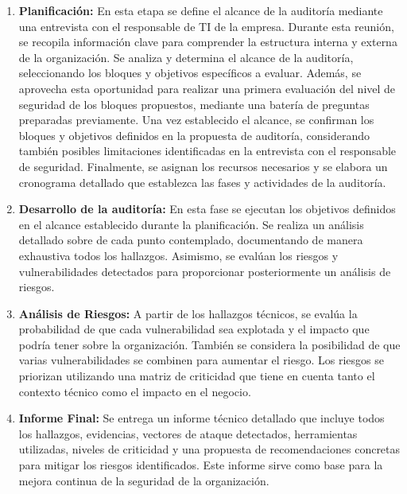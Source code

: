 \documentclass[a4paper, 10pt]{article}
\begin{document}
\begin{enumerate}
    \item \textbf{Planificación:} En esta etapa se define el alcance de la auditoría mediante una entrevista con el responsable de TI de la empresa. Durante esta reunión, se recopila información clave para comprender la estructura interna y externa de la organización. Se analiza y determina el alcance de la auditoría, seleccionando los bloques y objetivos específicos a evaluar. Además, se aprovecha esta oportunidad para realizar una primera evaluación del nivel de seguridad de los bloques propuestos, mediante una batería de preguntas preparadas previamente. Una vez establecido el alcance, se confirman los bloques y objetivos definidos en la propuesta de auditoría, considerando también posibles limitaciones identificadas en la entrevista con el responsable de seguridad. Finalmente, se asignan los recursos necesarios y se elabora un cronograma detallado que establezca las fases y actividades de la auditoría.
    \item \textbf{Desarrollo de la auditoría:} En esta fase se ejecutan los objetivos definidos en el alcance establecido durante la planificación. 
    Se realiza un análisis detallado sobre de cada punto contemplado, documentando de manera exhaustiva todos los hallazgos. 
    Asimismo, se evalúan los riesgos y vulnerabilidades detectados para proporcionar posteriormente un análisis de riesgos. 

    \item \textbf{Análisis de Riesgos:} A partir de los hallazgos técnicos, se evalúa la probabilidad de que cada vulnerabilidad sea explotada y el impacto que podría tener sobre la organización. También se considera la posibilidad de que varias vulnerabilidades se combinen para aumentar el riesgo. Los riesgos se priorizan utilizando una matriz de criticidad que tiene en cuenta tanto el contexto técnico como el impacto en el negocio.
    \item \textbf{Informe Final:} Se entrega un informe técnico detallado que incluye todos los hallazgos, evidencias, vectores de ataque detectados, herramientas utilizadas, niveles de criticidad y una propuesta de recomendaciones concretas para mitigar los riesgos identificados. Este informe sirve como base para la mejora continua de la seguridad de la organización.
\end{enumerate}


\clearpage




\end{document}
